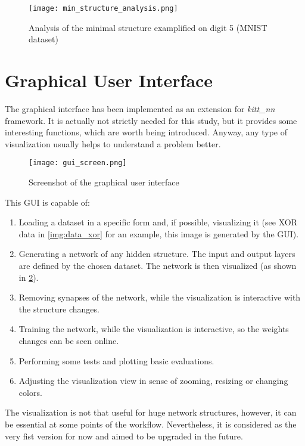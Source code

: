 \begin{figure}[H]
  \centering
  \texttt{[image: min\_structure\_analysis.png]}
  \caption{Analysis of the minimal structure examplified on digit 5 (MNIST dataset)}
  \label{img:structure_util}
\end{figure}

\section{Graphical User Interface} \label{sec:gui}
The graphical interface has been implemented as an extension for \textit{kitt\_nn} framework. It is actually not strictly needed for this study, but it provides some interesting functions, which are worth being introduced. Anyway, any type of visualization usually helps to understand a problem better.

\begin{figure}[H]
  \centering
  \texttt{[image: gui\_screen.png]}
  \caption{Screenshot of the graphical user interface}
  \label{img:gui_screen}
\end{figure}

This GUI is capable of:
\begin{enumerate}
\item Loading a dataset in a specific form and, if possible, visualizing it (see XOR data in \cref{img:data_xor} for an example, this image is generated by the GUI).
\item Generating a network of any hidden structure. The input and output layers are defined by the chosen dataset. The network is then visualized (as shown in \cref{img:gui_screen}).
\item Removing synapses of the network, while the visualization is interactive with the structure changes.
\item Training the network, while the visualization is interactive, so the weights changes can be seen online.
\item Performing some tests and plotting basic evaluations.
\item Adjusting the visualization view in sense of zooming, resizing or changing colors.
\end{enumerate}

The visualization is not that useful for huge network structures, however, it can be essential at some points of the workflow. Nevertheless, it is considered as the very fist version for now and aimed to be upgraded in the future.